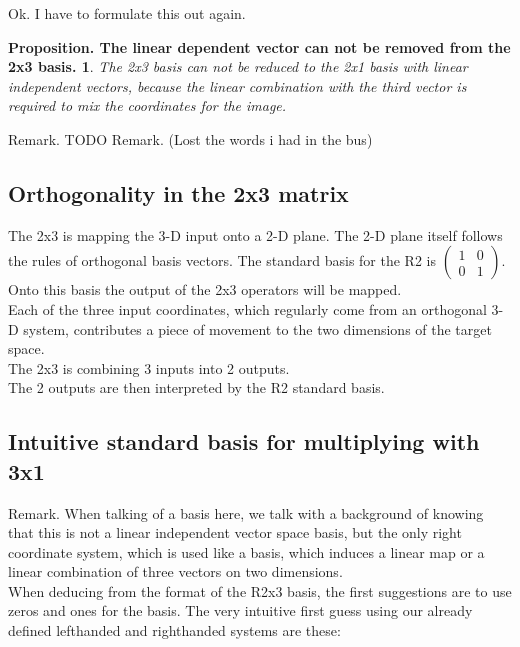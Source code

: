 \documentclass[a4paper]{article}
\begin{document}
\begin{Example}
\begin{PropositionOpt4}
Ok. I have to formulate this out again.

\newtheorem{PropositionOpt6}{Proposition. The linear dependent vector can not be removed from the 2x3 basis.}
\begin{PropositionOpt6}
The 2x3 basis can not be reduced to the 2x1 basis with linear independent vectors, because the linear combination with the third vector is required to mix the coordinates for the image.
\end{PropositionOpt6}

Remark. TODO
Remark. (Lost the words i had in the bus)



\subsection{Orthogonality in the 2x3 matrix}

The 2x3 is mapping the 3-D input onto a 2-D plane. The 2-D plane itself follows the rules of orthogonal basis vectors. The standard basis for the R2 is $\begin{pmatrix}1&0\\0&1\end{pmatrix}$. Onto this basis the output of the 2x3 operators will be mapped.\\

Each of the three input coordinates, which regularly come from an orthogonal 3-D system, contributes a piece of movement to the two dimensions of the target space.\\

The 2x3 is combining 3 inputs into 2 outputs.\\

The 2 outputs are then interpreted by the R2 standard basis.



\subsection{Intuitive standard basis for multiplying with 3x1}
\label{intuitive_standard_basis}
Remark. When talking of a basis here, we talk with a background of knowing that this is not a linear independent vector space basis, but the only right coordinate system, which is used like a basis, which induces a linear map or a linear combination of three vectors on two dimensions.\\

When deducing from the format of the R2x3 basis, the first suggestions are to use zeros and ones for the basis. The very intuitive first guess using our already defined lefthanded and righthanded systems are these:\\


\end{PropositionOpt4}
\end{Example}
\end{document}

